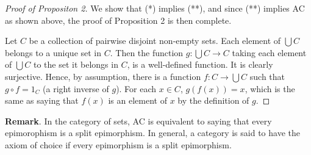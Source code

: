 \documentclass[12pt]{article}
\begin{document}
\begin{proof}[Proof of Propositon 2]  We show that (*) implies (**), and since (**) implies AC as shown above, the proof of Proposition 2 is then complete.

Let $C$ be a collection of pairwise disjoint non-empty sets.  Each element of $\bigcup C$ belongs to a unique set in $C$.  Then the function $g:\bigcup C \to C$ taking each element of $\bigcup C$ to the set it belongs in $C$, is a well-defined function.  It is clearly surjective.  Hence, by assumption, there is a function $f:C\to \bigcup C$ such that $g\circ f=1_C$ (a right inverse of $g$).  For each $x\in C$, $g(f(x))=x$, which is the same as saying that $f(x)$ is an element of $x$ by the definition of $g$.
\end{proof}

\textbf{Remark}.  In the category of sets, AC is equivalent to saying that every epimorophism is a split epimorphism.  In general, a category is said to have the axiom of choice if every epimorphism is a split epimorphism.

\end{document}
